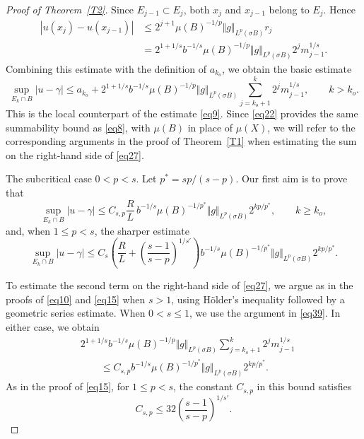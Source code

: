 \documentclass[12pt,leqno]{amsart}
\theoremstyle{definition}
\numberwithin{theorem}{section} \numberwithin{equation}{section}
\begin{document}
\begin{proof}[Proof of Theorem~\ref{T2}]
Since $E_{j-1}\subset E_j$, both $x_j$ and $x_{j-1}$ belong to $E_j$. Hence
\begin{align*}
|u(x_j)-u(x_{j-1})|
&\leq2^{j+1}\mu(B)^{-1/p}\Vert g\Vert_{L^p(\sigma B)}r_j
\\
&=2^{1+1/s}b^{-1/s}\mu(B)^{-1/p}\Vert g\Vert_{L^p(\sigma B)}
2^jm_{j-1}^{1/s}.
\end{align*}
Combining this estimate with the definition of $a_{k_o}$, we obtain the basic estimate
\begin{equation}
\label{eq27}
 \sup_{E_k\cap B}|u-\gamma|
 \leq a_{k_o}
 +2^{1+1/s}b^{-1/s}\mu(B)^{-1/p}\Vert g\Vert_{L^p(\sigma B)}
 \sum_{j=k_o+1}^k2^jm_{j-1}^{1/s},
 \qquad k>k_o.
\end{equation}
This is the local counterpart of the estimate \eqref{eq9}. 
Since \eqref{eq22} provides the same summability
bound as \eqref{eq8}, with $\mu(B)$ in place of $\mu(X)$,
we will refer to the corresponding arguments
in the proof of Theorem~\ref{T1} when estimating the sum
on the right-hand side of \eqref{eq27}.


\medskip
\noindent
{\sc The subcritical case $0<p<s$.}
Let $p^*=sp/(s-p)$. Our first aim is to prove that
\begin{equation}
\label{eq28}
 \sup_{E_k\cap B}|u-\gamma|
 \leq C_{s,p}\frac RL\,b^{-1/s}\mu(B)^{-1/p^*}
 \Vert g\Vert_{L^p(\sigma B)}2^{kp/p^*},
 \qquad k\geq k_o,
\end{equation}
and, when $1\leq p<s$, the sharper estimate
\begin{equation}
\label{eq29}
 \sup_{E_k\cap B}|u-\gamma|
 \leq C_s\left(
 \frac RL+\left(\frac{s-1}{s-p}\right)^{1/s'}
 \right)b^{-1/s}\mu(B)^{-1/p^*}
 \Vert g\Vert_{L^p(\sigma B)}2^{kp/p^*}.
\end{equation}


To estimate the second term on the right-hand side of \eqref{eq27},
we argue as in the proofs of \eqref{eq10} and \eqref{eq15} when
$s>1$, using H\"older's inequality followed by a geometric series
estimate. When $0<s\leq1$, we use the argument in \eqref{eq39}.
In either case, we obtain
\begin{equation}
\label{eq:local-subcritical-increments}
\begin{aligned}
&2^{1+1/s}b^{-1/s}\mu(B)^{-1/p}
 \Vert g\Vert_{L^p(\sigma B)}
 \sum_{j=k_o+1}^k2^jm_{j-1}^{1/s}\\
&\qquad\leq
 C_{s,p}b^{-1/s}\mu(B)^{-1/p^*}
 \Vert g\Vert_{L^p(\sigma B)}2^{kp/p^*}.
\end{aligned}
\end{equation}
As in the proof of \eqref{eq15}, for $1\leq p<s$, the constant $C_{s,p}$ in this bound
satisfies
\begin{equation}
\label{eq:local-subcritical-increments - constant}
 C_{s,p}\leq
 32\left(\frac{s-1}{s-p}\right)^{1/s'}.
\end{equation}


\end{proof}
\end{document}
